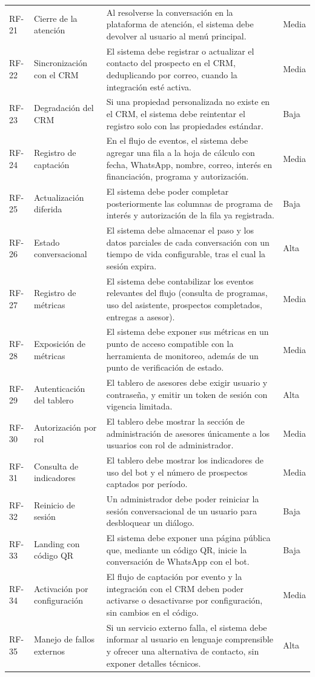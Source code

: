 \documentclass[12pt,a4paper]{report}
\begin{document}
{\begin{longtable}{p{1.4cm}p{3.3cm}p{7.4cm}p{1.4cm}}
RF-21 & Cierre de la atención & Al resolverse la conversación en la plataforma de atención, el sistema debe devolver al usuario al menú principal. & Media \\
RF-22 & Sincronización con el CRM & El sistema debe registrar o actualizar el contacto del prospecto en el CRM, deduplicando por correo, cuando la integración esté activa. & Media \\
RF-23 & Degradación del CRM & Si una propiedad personalizada no existe en el CRM, el sistema debe reintentar el registro solo con las propiedades estándar. & Baja \\
RF-24 & Registro de captación & En el flujo de eventos, el sistema debe agregar una fila a la hoja de cálculo con fecha, WhatsApp, nombre, correo, interés en financiación, programa y autorización. & Media \\
RF-25 & Actualización diferida & El sistema debe poder completar posteriormente las columnas de programa de interés y autorización de la fila ya registrada. & Baja \\
RF-26 & Estado conversacional & El sistema debe almacenar el paso y los datos parciales de cada conversación con un tiempo de vida configurable, tras el cual la sesión expira. & Alta \\
RF-27 & Registro de métricas & El sistema debe contabilizar los eventos relevantes del flujo (consulta de programas, uso del asistente, prospectos completados, entregas a asesor). & Media \\
RF-28 & Exposición de métricas & El sistema debe exponer sus métricas en un punto de acceso compatible con la herramienta de monitoreo, además de un punto de verificación de estado. & Media \\
RF-29 & Autenticación del tablero & El tablero de asesores debe exigir usuario y contraseña, y emitir un token de sesión con vigencia limitada. & Alta \\
RF-30 & Autorización por rol & El tablero debe mostrar la sección de administración de asesores únicamente a los usuarios con rol de administrador. & Media \\
RF-31 & Consulta de indicadores & El tablero debe mostrar los indicadores de uso del bot y el número de prospectos captados por período. & Media \\
RF-32 & Reinicio de sesión & Un administrador debe poder reiniciar la sesión conversacional de un usuario para desbloquear un diálogo. & Baja \\
RF-33 & Landing con código QR & El sistema debe exponer una página pública que, mediante un código QR, inicie la conversación de WhatsApp con el bot. & Baja \\
RF-34 & Activación por configuración & El flujo de captación por evento y la integración con el CRM deben poder activarse o desactivarse por configuración, sin cambios en el código. & Media \\
RF-35 & Manejo de fallos externos & Si un servicio externo falla, el sistema debe informar al usuario en lenguaje comprensible y ofrecer una alternativa de contacto, sin exponer detalles técnicos. & Alta \\
\end{longtable}}
\end{document}
